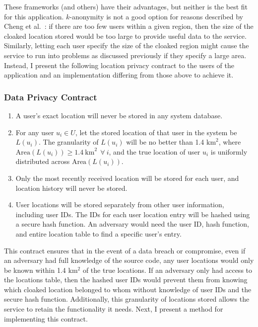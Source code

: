 These frameworks (and others) have their advantages, but neither is the best fit for this application. $k$-anonymity is not a good option for reasons described by Cheng et al.~\cite{Cheng2006}: if there are too few users within a given region, then the size of the cloaked location stored would be too large to provide useful data to the service. Similarly, letting each user specify the size of the cloaked region might cause the service to run into problems as discussed previously if they specify a large area. Instead, I present the following location privacy contract to the users of the application and an implementation differing from those above to achieve it.

\subsubsection{Data Privacy Contract} \label{sec:privacycontract}

\begin{enumerate}
    \item A user's exact location will never be stored in any system database.
    \item For any user $u_i \in U$, let the stored location of that user in the system be $L(u_i)$. The granularity of $L(u_i)$ will be no better than 1.4 $\text{km}^2$, where $\text{Area}(L(u_i)) \geq 1.4 \ \text{km}^2 \ \ \forall \ i$, and the true location of user $u_i$ is uniformly distributed across $\text{Area}(L(u_i))$.
    \item Only the most recently received location will be stored for each user, and location history will never be stored.
    \item User locations will be stored separately from other user information, including user IDs. The IDs for each user location entry will be hashed using a secure hash function. An adversary would need the user ID, hash function, and entire location table to find a specific user's entry.
\end{enumerate}

This contract ensures that in the event of a data breach or compromise, even if an adversary had full knowledge of the source code, any user locations would only be known within 1.4 km$^2$ of the true locations. If an adversary only had access to the locations table, then the hashed user IDs would prevent them from knowing which cloaked location belonged to whom without knowledge of user IDs and the secure hash function. Additionally, this granularity of locations stored allows the service to retain the functionality it needs. Next, I present a method for implementing this contract.


